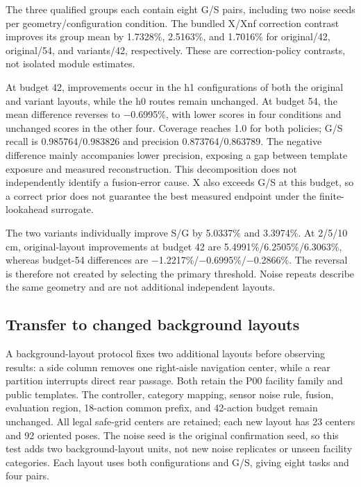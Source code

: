 The three qualified groups each contain eight G/S pairs, including two noise seeds per geometry/configuration condition. The bundled X/Xnf correction contrast improves its group mean by 1.7328\%, 2.5163\%, and 1.7016\% for original/42, original/54, and variants/42, respectively. These are correction-policy contrasts, not isolated module estimates.

At budget 42, improvements occur in the h1 configurations of both the original and variant layouts, while the h0 routes remain unchanged. At budget 54, the mean difference reverses to \ensuremath{-}0.6995\%, with lower scores in four conditions and unchanged scores in the other four. Coverage reaches 1.0 for both policies; G/S recall is 0.985764/0.983826 and precision 0.873764/0.863789. The negative difference mainly accompanies lower precision, exposing a gap between template exposure and measured reconstruction. This decomposition does not independently identify a fusion-error cause. X also exceeds G/S at this budget, so a correct prior does not guarantee the best measured endpoint under the finite-lookahead surrogate.

The two variants individually improve S/G by 5.0337\% and 3.3974\%. At 2/5/10 cm, original-layout improvements at budget 42 are 5.4991\%/6.2505\%/6.3063\%, whereas budget-54 differences are \ensuremath{-}1.2217\%/\ensuremath{-}0.6995\%/\ensuremath{-}0.2866\%. The reversal is therefore not created by selecting the primary threshold. Noise repeats describe the same geometry and are not additional independent layouts.



\hypertarget{transfer-to-changed-background-layouts}{%
\subsection{Transfer to changed background layouts}\label{transfer-to-changed-background-layouts}}

A background-layout protocol fixes two additional layouts before observing results: a side column removes one right-aisle navigation center, while a rear partition interrupts direct rear passage. Both retain the P00 facility family and public templates. The controller, category mapping, sensor noise rule, fusion, evaluation region, 18-action common prefix, and 42-action budget remain unchanged. All legal safe-grid centers are retained; each new layout has 23 centers and 92 oriented poses. The noise seed is the original confirmation seed, so this test adds two background-layout units, not new noise replicates or unseen facility categories. Each layout uses both configurations and G/S, giving eight tasks and four pairs.


